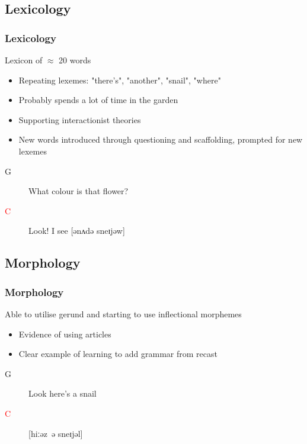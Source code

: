 \documentclass[compress]{beamer}
\begin{document}
\subsection{Lexicology}
\begin{frame}
	\frametitle{Lexicology}
	
	Lexicon of $\approx$ 20 words
	
	\begin{itemize}
		\item Repeating lexemes: "there's", "another", "snail", "where"
		\item Probably spends a lot of time in the garden
		\item Supporting interactionist theories
	\end{itemize}
	
	\begin{itemize}
		\item New words introduced through questioning and scaffolding, prompted for new lexemes
	\end{itemize}
	\begin{description}
		\item[G] What colour is that flower?
		\item[\textcolor{red}{C}] Look! I see [ənʌdə sneɪjəw]
	\end{description}
	
\end{frame}

\subsection{Morphology}
\begin{frame}
	\frametitle{Morphology}
	
	Able to utilise gerund and starting to use inflectional morphemes
	
	\begin{itemize}
		\item Evidence of using articles
		\item Clear example of learning to add grammar from recast
	\end{itemize}
	\begin{description}
		\item[G] Look here's a snail
		\item[\textcolor{red}{C}] [hiːəz ə sneɪjəl]
	\end{description}
	
\end{frame}
\end{document}
